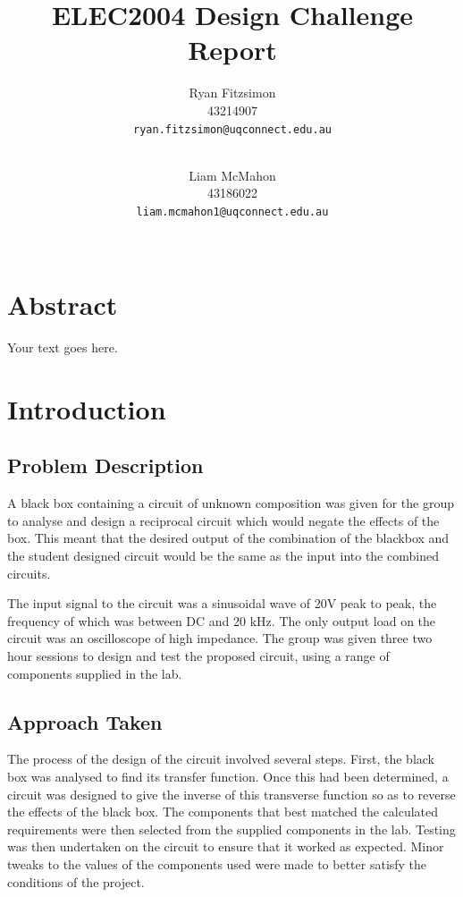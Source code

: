 \documentclass[12pt]{article} %
\title{ELEC2004 Design Challenge Report}
\author{
	{Ryan Fitzsimon}\\
	{43214907}\\
	\texttt{ryan.fitzsimon@uqconnect.edu.au}\\\\
	\and
	{Liam McMahon}\\
	{43186022}\\
	\texttt{liam.mcmahon1@uqconnect.edu.au}\\\\
}
\begin{document}
\maketitle
\pagebreak





\section*{Abstract}
\cite{ProgPara}
Your text goes here.
\pagebreak





\tableofcontents
\pagebreak
\listoftables
\listoffigures
\pagebreak





\section{Introduction}
\subsection{Problem Description}

A black box containing a circuit of unknown composition was given for the group to analyse and design a reciprocal circuit which would negate the effects of the box. This meant that the desired output of the combination of the blackbox and the student designed circuit would be the same as the input into the combined circuits. 


The input signal to the circuit was a sinusoidal wave of 20V peak to peak, the frequency of which was between DC and 20 kHz. The only output load on the circuit was an oscilloscope of high impedance. The group was given three two hour sessions to design and test the proposed circuit, using a range of components supplied in the lab.



\subsection{Approach Taken}

The process of the design of the circuit involved several steps. First, the black box was analysed to find its transfer function. Once this had been determined, a circuit was designed to give the inverse of this transverse function so as to reverse the effects of the black box. The components that best matched the calculated requirements were then selected from the supplied components in the lab. Testing was then undertaken on the circuit to ensure that it worked as expected. Minor tweaks to the values of the components used were made to better satisfy the conditions of the project.
\end{document}
